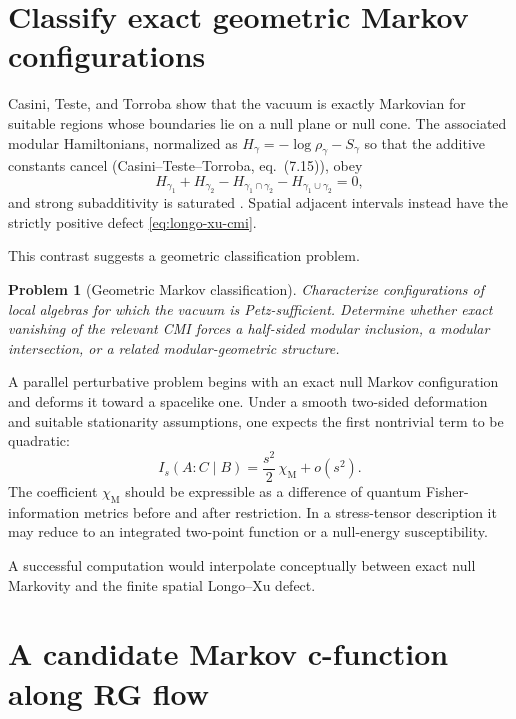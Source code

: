 \documentclass[11pt]{article}
\theoremstyle{accenttheorem}
\newtheorem{problem}[conjecture]{Problem}
\theoremstyle{definition}
\newcommand{\CMI}{I}
\newcommand{\1}{\mathbf{1}}
\begin{document}
\section{Classify exact geometric Markov configurations}

Casini, Teste, and Torroba show that the vacuum is exactly Markovian for suitable regions whose boundaries lie on a null plane or null cone.  The associated modular Hamiltonians, normalized as \(H_\gamma=-\log\rho_\gamma-S_\gamma\) so that the additive constants cancel (Casini--Teste--Torroba, eq.~(7.15)), obey
\begin{equation}\label{eq:null-markov}
 H_{\gamma_1}+H_{\gamma_2}
 -H_{\gamma_1\cap\gamma_2}
 -H_{\gamma_1\cup\gamma_2}=0,
\end{equation}
and strong subadditivity is saturated \cite{CasiniTesteTorroba}.  Spatial adjacent intervals instead have the strictly positive defect \eqref{eq:longo-xu-cmi}.

This contrast suggests a geometric classification problem.

\begin{problem}[Geometric Markov classification]
Characterize configurations of local algebras for which the vacuum is Petz-sufficient.  Determine whether exact vanishing of the relevant CMI forces a half-sided modular inclusion, a modular intersection, or a related modular-geometric structure.
\end{problem}

A parallel perturbative problem begins with an exact null Markov configuration and deforms it toward a spacelike one.  Under a smooth two-sided deformation and suitable stationarity assumptions, one expects the first nontrivial term to be quadratic:
\begin{equation}\label{eq:markov-susceptibility}
 \CMI_s(A:C\mid B)
 =\frac{s^2}{2}\,\chi_{\mathrm M}+o(s^2).
\end{equation}
The coefficient \(\chi_{\mathrm M}\) should be expressible as a difference of quantum Fisher-information metrics before and after restriction.  In a stress-tensor description it may reduce to an integrated two-point function or a null-energy susceptibility.

A successful computation would interpolate conceptually between exact null Markovity and the finite spatial Longo--Xu defect.

\section{A candidate Markov c-function along RG flow}
\end{document}
